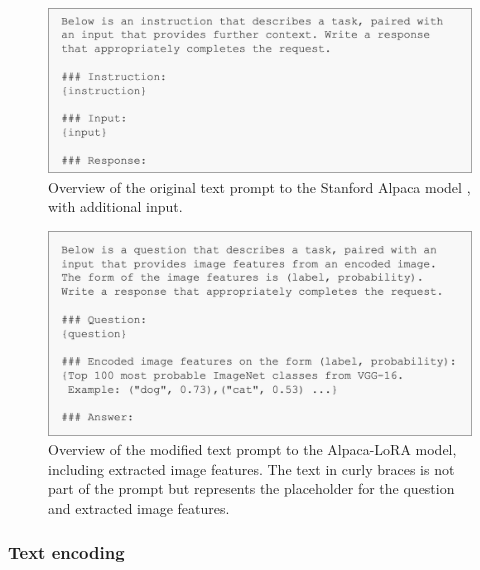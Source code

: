         \begin{figure}[htb]
            \centerline{
            \includegraphics[width=\textwidth]{images/alpaca_prompt_format.png}}
            \caption[Overview of the original text prompt to the Stanford Alpaca model, with additional input.]{Overview of the original text prompt to the Stanford Alpaca model \cite{taoriStanfordCRFM, taoriStanfordAlpacaInstructionfollowing2023}, with additional input.}
            \label{fig:alpaca_prompt_format}
        \end{figure}

        \begin{figure}[htb]
            \centerline{
            \includegraphics[width=\textwidth]{images/alpaca_modified_prompt_format.png}}
            \caption{Overview of the modified text prompt to the Alpaca-LoRA model, including extracted image features. The text in curly braces is not part of the prompt but represents the placeholder for the question and extracted image features.}
            \label{fig:alpaca_modified_prompt_format}
        \end{figure}



        

        \subsubsection{Text encoding}
        \label{sec3:text_encoding}

